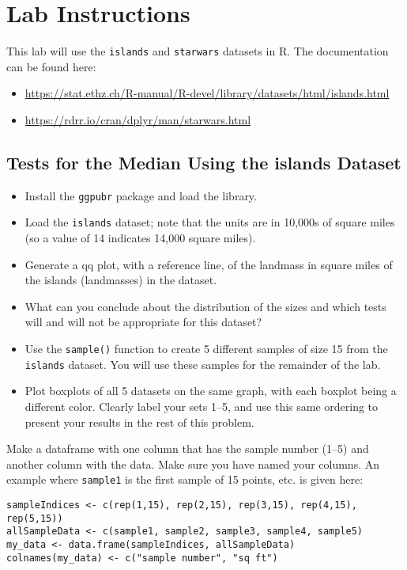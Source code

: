 \documentclass{article}
\begin{document}
\section*{Lab Instructions}

This lab will use the \texttt{islands} and \texttt{starwars} datasets in R. The documentation can be found here:

\begin{itemize}
    \item \url{https://stat.ethz.ch/R-manual/R-devel/library/datasets/html/islands.html}
    \item \url{https://rdrr.io/cran/dplyr/man/starwars.html}
\end{itemize}

\subsection*{Tests for the Median Using the islands Dataset}

\begin{itemize}
    \item Install the \texttt{ggpubr} package and load the library.
    \item Load the \texttt{islands} dataset; note that the units are in 10,000s of square miles (so a value of 14 indicates 14,000 square miles).
    \item Generate a qq plot, with a reference line, of the landmass in square miles of the islands (landmasses) in the dataset.
    \item What can you conclude about the distribution of the sizes and which tests will and will not be appropriate for this dataset?
    \item Use the \texttt{sample()} function to create 5 different samples of size 15 from the \texttt{islands} dataset. You will use these samples for the remainder of the lab.
    \item Plot boxplots of all 5 datasets on the same graph, with each boxplot being a different color. Clearly label your sets 1--5, and use this same ordering to present your results in the rest of this problem.
\end{itemize}

Make a dataframe with one column that has the sample number (1--5) and another column with the data. Make sure you have named your columns. An example where \texttt{sample1} is the first sample of 15 points, etc. is given here:

\begin{verbatim}
sampleIndices <- c(rep(1,15), rep(2,15), rep(3,15), rep(4,15), rep(5,15))
allSampleData <- c(sample1, sample2, sample3, sample4, sample5)
my_data <- data.frame(sampleIndices, allSampleData)
colnames(my_data) <- c("sample number", "sq ft")
\end{verbatim}
\end{document}
